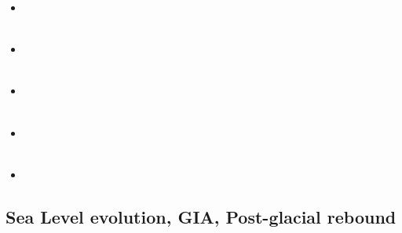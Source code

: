 \begin{scriptsize}
\begin{itemize}
\item[\twothousandfifteen] 
\textcite{feka15} \\
\textcite{cofk15} \\
\item[\twothousandsixteen] 
\textcite{masg16} \\
\textcite{albe16} \\
\item[\twothousandseventeen] 
\textcite{grbe17} \\
\textcite{henf17} \\
\item[\twothousandnineteen] 
\textcite{hadv19} \\
\textcite{clcc19} \\
\item[\twothousandtwentyone]
\textcite{haao21} \\ 
\end{itemize}
\end{scriptsize}

\subsection{Sea Level evolution, GIA, Post-glacial rebound}

